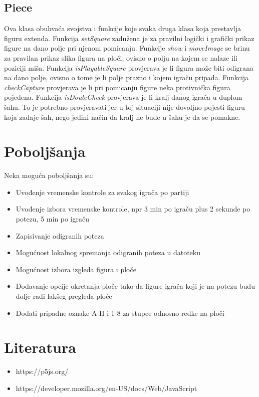 \documentclass[11pt]{article}
\begin{document}
\subsection{Piece}
Ova klasa obuhvaća svojstva i funkcije koje svaka druga klasa koja prestavlja figuru extenda.
Funkcija \textit{setSquare} zadužena je za pravilni logički i grafički prikaz figure na dano polje pri njenom pomicanju. 
Funkcije \textit{show} i \textit{moveImage} se brinu za pravilan prikaz slika figura na ploči, ovisno o polju na kojem se nalaze ili poziciji miša.
Funkcija \textit{isPlayableSquare} provjerava je li figura može biti odigrana na dano polje, ovisno o tome je li polje prazno i kojem igraču pripada.
Funkcija \textit{checkCapture} provjerava je li pri pomicanju figure neka protivnička figura pojedena.
Funkcija \textit{isDouleCheck} provjerava je li kralj danog igrača u duplom šahu. To je potrebno provjeravati jer u toj situaciji nije dovoljno pojesti
figuru koja zadaje šah, nego jedini način da kralj ne bude u šahu je da se pomakne.

\section{Poboljšanja}
Neka moguća poboljšanja su:
\begin{itemize}
    \item Uvođenje vremenske kontrole za svakog igrača po partiji
    \item Uvođenje izbora vremenske kontrole, npr 3 min po igraču plus 2 sekunde po potezu, 5 min po igraču
    \item Zapisivanje odigranih poteza
    \item Mogućnost lokalnog spremanja odigranih poteza u datoteku
    \item Mogućnost izbora izgleda figura i ploče
    \item Dodavanje opcije okretanja ploče tako da figure igrača koji je na potezu budu dolje radi lakšeg pregleda ploče
    \item Dodati pripadne oznake A-H i 1-8 za stupce odnosno redke na ploči
\end{itemize} 

\section{Literatura}
\begin{itemize}
    \item https://p5js.org/
    \item https://developer.mozilla.org/en-US/docs/Web/JavaScript
\end{itemize}
\end{document}
